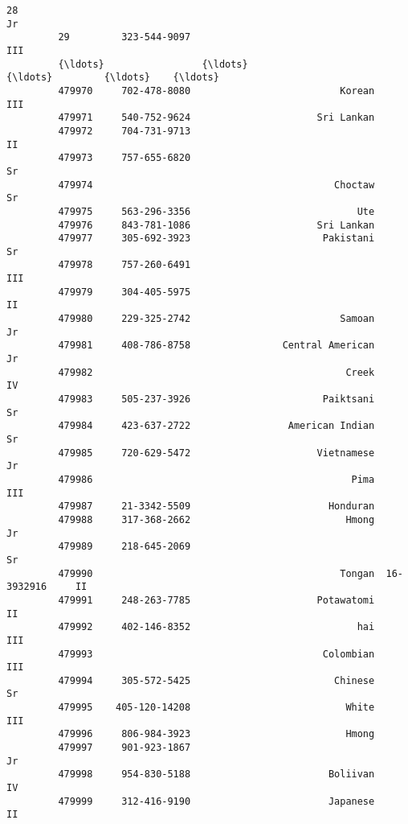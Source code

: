 \documentclass[11pt]{article}
\begin{document}
\begin{Verbatim}[commandchars=\\\{\}]
         28                                                                      Jr   
         29         323-544-9097                                                III   
         {\ldots}                 {\ldots}                             {\ldots}         {\ldots}    {\ldots}   
         479970     702-478-8080                          Korean                III   
         479971     540-752-9624                      Sri Lankan                      
         479972     704-731-9713                                                 II   
         479973     757-655-6820                                                 Sr   
         479974                                          Choctaw                 Sr   
         479975     563-296-3356                             Ute                      
         479976     843-781-1086                      Sri Lankan                      
         479977     305-692-3923                       Pakistani                 Sr   
         479978     757-260-6491                                                III   
         479979     304-405-5975                                                 II   
         479980     229-325-2742                          Samoan                 Jr   
         479981     408-786-8758                Central American                 Jr   
         479982                                            Creek                 IV   
         479983     505-237-3926                       Paiktsani                 Sr   
         479984     423-637-2722                 American Indian                 Sr   
         479985     720-629-5472                      Vietnamese                 Jr   
         479986                                             Pima                III   
         479987     21-3342-5509                        Honduran                      
         479988     317-368-2662                           Hmong                 Jr   
         479989     218-645-2069                                                 Sr   
         479990                                           Tongan  16-3932916     II   
         479991     248-263-7785                      Potawatomi                 II   
         479992     402-146-8352                             hai                III   
         479993                                        Colombian                III   
         479994     305-572-5425                         Chinese                 Sr   
         479995    405-120-14208                           White                III   
         479996     806-984-3923                           Hmong                      
         479997     901-923-1867                                                 Jr   
         479998     954-830-5188                        Boliivan                 IV   
         479999     312-416-9190                        Japanese                 II   
         

\end{Verbatim}
\end{document}
